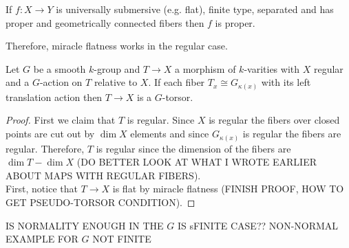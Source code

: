 \documentclass[12pt]{article}
\begin{document}
\begin{prop}[EGA IV.15.7.10]
If $f : X \to Y$ is universally submersive (e.g. flat), finite type, separated and has proper and geometrically connected fibers then $f$ is proper.
\end{prop}


Therefore, miracle flatness works in the regular case. 

\begin{prop}
Let $G$ be a smooth $k$-group and $T \to X$ a morphism of $k$-varities with $X$ regular and a $G$-action on $T$ relative to $X$. If each fiber $T_x \cong G_{\kappa(x)}$ with its left translation action then $T \to X$ is a $G$-torsor. 
\end{prop}

\begin{proof}
First we claim that $T$ is regular. Since $X$ is regular the fibers over closed points are cut out by $\dim{X}$ elements and since $G_{\kappa(x)}$ is regular the fibers are regular. Therefore, $T$ is regular since the dimension of the fibers are $\dim{T} - \dim{X}$ (DO BETTER LOOK AT WHAT I WROTE EARLIER ABOUT MAPS WITH REGULAR FIBERS).
\bigskip\\
First, notice that $T \to X$ is flat by miracle flatness (FINISH PROOF, HOW TO GET PSEUDO-TORSOR CONDITION).
\end{proof}


IS NORMALITY ENOUGH IN THE $G$ IS sFINITE CASE?? NON-NORMAL EXAMPLE FOR $G$ NOT FINITE
\end{document}
